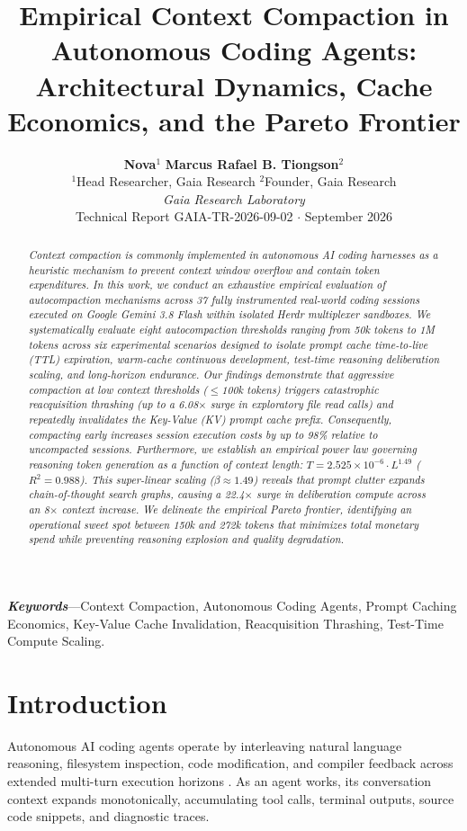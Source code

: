 \documentclass[10pt,twocolumn,a4paper]{article}
\title{\textbf{\Large Empirical Context Compaction in Autonomous Coding Agents:\\Architectural Dynamics, Cache Economics, and the Pareto Frontier}}
\author{
  \textbf{Nova}$^1$ \quad \textbf{Marcus Rafael B. Tiongson}$^2$ \\
  $^1$Head Researcher, Gaia Research \quad $^2$Founder, Gaia Research \\
  \textit{Gaia Research Laboratory} \\
  Technical Report GAIA-TR-2026-09-02 $\cdot$ September 2026
}
\date{}
\begin{document}
\maketitle
\thispagestyle{myheadings}

\begin{abstract}
\textit{Context compaction is commonly implemented in autonomous AI coding harnesses as a heuristic mechanism to prevent context window overflow and contain token expenditures. In this work, we conduct an exhaustive empirical evaluation of autocompaction mechanisms across 37 fully instrumented real-world coding sessions executed on Google Gemini 3.8 Flash within isolated Herdr multiplexer sandboxes. We systematically evaluate eight autocompaction thresholds ranging from 50k tokens to 1M tokens across six experimental scenarios designed to isolate prompt cache time-to-live (TTL) expiration, warm-cache continuous development, test-time reasoning deliberation scaling, and long-horizon endurance. Our findings demonstrate that aggressive compaction at low context thresholds ($\le$100k tokens) triggers catastrophic reacquisition thrashing (up to a 6.08$\times$ surge in exploratory file read calls) and repeatedly invalidates the Key-Value (KV) prompt cache prefix. Consequently, compacting early increases session execution costs by up to 98\% relative to uncompacted sessions. Furthermore, we establish an empirical power law governing reasoning token generation as a function of context length: $T = 2.525 \times 10^{-6} \cdot L^{1.49}$ ($R^2 = 0.988$). This super-linear scaling ($\beta \approx 1.49$) reveals that prompt clutter expands chain-of-thought search graphs, causing a 22.4$\times$ surge in deliberation compute across an 8$\times$ context increase. We delineate the empirical Pareto frontier, identifying an operational sweet spot between 150k and 272k tokens that minimizes total monetary spend while preventing reasoning explosion and quality degradation.}
\end{abstract}

\textbf{\textit{Keywords}}---Context Compaction, Autonomous Coding Agents, Prompt Caching Economics, Key-Value Cache Invalidation, Reacquisition Thrashing, Test-Time Compute Scaling.

\section{Introduction}

Autonomous AI coding agents operate by interleaving natural language reasoning, filesystem inspection, code modification, and compiler feedback across extended multi-turn execution horizons \cite{vaswani2017attention,kwon2023vllm}. As an agent works, its conversation context expands monotonically, accumulating tool calls, terminal outputs, source code snippets, and diagnostic traces.
\end{document}
